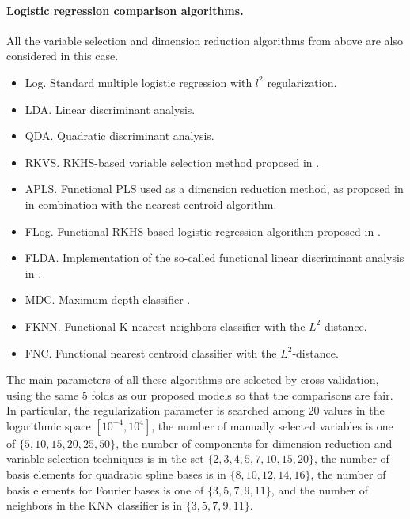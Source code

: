 \paragraph{Logistic regression comparison algorithms.} All the variable selection and dimension reduction algorithms from above are also considered in this case.
\begin{itemize}
  \item Log.\hspace{.3em} Standard multiple logistic regression with \(l^2\) regularization.
  \item LDA.\hspace{.3em} Linear discriminant analysis.
  \item QDA.\hspace{.3em} Quadratic discriminant analysis.
  \item RKVS.\hspace{.3em} RKHS-based variable selection method proposed in \citet{berrendero2018use}.
  \item APLS.\hspace{.3em} Functional PLS used as a dimension reduction method, as proposed in \citet{delaigle2012achieving} in combination with the nearest centroid algorithm.
  \item FLog.\hspace{.3em} Functional RKHS-based logistic regression algorithm proposed in \citet{berrendero2018functional}.
  \item FLDA.\hspace{.3em} Implementation of the so-called functional linear discriminant analysis in \citet{preda2007pls}.
  \item MDC.\hspace{.3em} Maximum depth classifier \citep[e.g.][]{ghosh2005maximum}.
  \item FKNN.\hspace{.3em} Functional K-nearest neighbors classifier with the \(L^2\)-distance.
  \item FNC.\hspace{.3em} Functional nearest centroid classifier with the \(L^2\)-distance.
\end{itemize}

The main parameters of all these algorithms are selected by cross-validation, using the same 5 folds as our proposed models so that the comparisons are fair. In particular, the regularization parameter is searched among 20 values in the logarithmic space \([10^{-4}, 10^4]\), the number of manually selected variables is one of \(\{5, 10, 15, 20, 25, 50\}\), the number of components for dimension reduction and variable selection techniques is in the set \(\{2, 3, 4, 5, 7, 10, 15, 20\}\), the number of basis elements for quadratic spline bases is in \(\{8,10,12,14,16\}\), the number of basis elements for Fourier bases is one of \(\{3,5,7,9,11\}\), and the number of neighbors in the KNN classifier is in \(\{3,5,7,9,11\}\).

